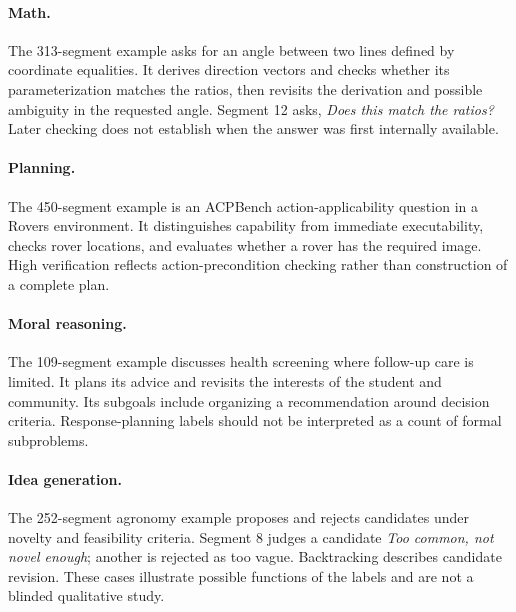 \paragraph{Math.} The 313-segment example asks for an angle between two lines defined by coordinate equalities. It derives direction vectors and checks whether its parameterization matches the ratios, then revisits the derivation and possible ambiguity in the requested angle. Segment 12 asks, \emph{Does this match the ratios?} Later checking does not establish when the answer was first internally available.

\paragraph{Planning.} The 450-segment example is an ACPBench action-applicability question in a Rovers environment. It distinguishes capability from immediate executability, checks rover locations, and evaluates whether a rover has the required image. High verification reflects action-precondition checking rather than construction of a complete plan.

\paragraph{Moral reasoning.} The 109-segment example discusses health screening where follow-up care is limited. It plans its advice and revisits the interests of the student and community. Its subgoals include organizing a recommendation around decision criteria. Response-planning labels should not be interpreted as a count of formal subproblems.

\paragraph{Idea generation.} The 252-segment agronomy example proposes and rejects candidates under novelty and feasibility criteria. Segment 8 judges a candidate \emph{Too common, not novel enough}; another is rejected as too vague. Backtracking describes candidate revision. These cases illustrate possible functions of the labels and are not a blinded qualitative study.

